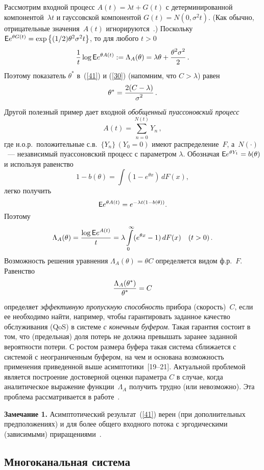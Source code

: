\begin{multicols}{2}
Рассмотрим входной процесс $ A(t)=\lambda t +G(t)$ с
детерминированной компонентой~$\lambda t $ и гауссовской компонентой
 $G(t)= N(0,\sigma^2 t)$. (Как обычно, отрицательные значения~$A(t)$
 игнорируются~\cite{Kelly}.) Поскольку $ {\sf E} e^{\theta G(t)} = \exp
\left\{(1/2)\theta^2 \sigma^2t\right\}$, то для любого $t>0$
\begin{equation*}
\displaystyle\frac{\displaystyle 1\mathstrut}{\displaystyle t\mathstrut} \log {\sf E} e ^{\theta A(t)}:=\Lambda_A(\theta)= \lambda
\theta + \displaystyle\frac{\displaystyle \theta^2 \sigma^2\mathstrut}{\displaystyle 2\mathstrut}\,.
\end{equation*}
Поэтому показатель $\theta^* $ в~(\ref{41}) и (\ref{30})
 (напомним, что $C>\lambda$) равен
 $$
\theta^*=\displaystyle\frac{\displaystyle  2(C-\lambda)\mathstrut}{\displaystyle \sigma^2\mathstrut}\,.
$$
Другой полезный пример дает входной {\it обобщенный пуассоновский процесс}~\cite {Feller}
$$
A(t)=\sum\limits_{n=0}^{N(t)}Y_n\,,
$$
где н.о.р.\ положительные с.в.\ $\{Y_n\}\, (Y_0=0) $ имеют
распределение~$F$, а~$N(\cdot)$~--- независимый пуассоновский
процесс с параметром $\lambda$. Обозначая $ {\sf E} e^{\theta Y_1} = b(\theta)$ и
используя равенство
$$ 1-b(\theta)=\int (1-e^{\theta x})\,dF(x),$$
легко получить
$${\sf E} e^{\theta A(t)} = e^{-\lambda t(1-b(\theta))}.$$
 Поэтому
$$
\Lambda_A(\theta)=\displaystyle\frac{\displaystyle \log {\sf E} e^{A(t)}\mathstrut}{\displaystyle  t\mathstrut}= \lambda\int\limits_0^\infty
(e^{\theta x}-1)\,dF(x) \quad (t>0)\,.
$$
Возможность решения уравнения $\Lambda_A(\theta)=\theta C $ определяется видом ф.р.~$F$. Равенство
\begin{equation*}
\displaystyle\frac{\displaystyle \Lambda_A(\theta^*)\mathstrut}{\displaystyle \theta^*\mathstrut}=C
\end{equation*}
 определяет {\it эффективную пропускную способность } прибора (скорость)~$C$, если
 ее необходимо найти, например, чтобы гарантировать заданное качество обслуживания (QoS) в системе {\it с
конечным буфером}. Такая гарантия состоит в том, что (предельная)
доля потерь не должна превышать заранее заданной вероятности потери. С ростом размера буфера такая система сближается с системой
с неограниченным буфером, на чем и основана возможность применения
приведенной выше асимптотики~[19--21]. Актуальной
проблемой является построение достоверной оценки параметра $C$ в
случае, когда аналитическое выражение функции~$\Lambda_A$ получить
трудно (или невозможно). Эта проблема рас\-смат\-ри\-ва\-ет\-ся в работе~\cite{Irina07}.

\smallskip

\noindent
{\bf Замечание 1.} Асимптотический результат~(\ref{41}) верен (при дополнительных предположениях)
 и для более общего входного потока с эргодическими (зависимыми) приращениями~\cite {GW}.

\subsection{Многоканальная система}


\end{multicols}
